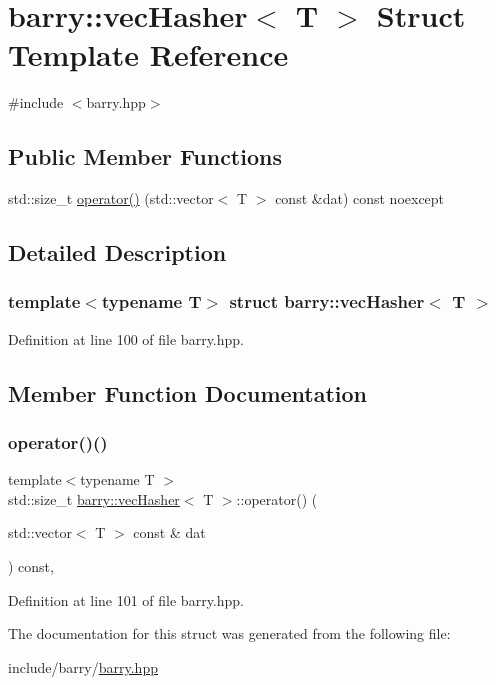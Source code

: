 \hypertarget{structbarry_1_1vec_hasher}{}\section{barry\+:\+:vec\+Hasher$<$ T $>$ Struct Template Reference}
\label{structbarry_1_1vec_hasher}


{\ttfamily \#include $<$barry.\+hpp$>$}

\subsection*{Public Member Functions}
\begin{DoxyCompactItemize}
\item 
std\+::size\+\_\+t \hyperlink{structbarry_1_1vec_hasher_ada8dea483f4fc12f469e161b2fd09225}{operator()} (std\+::vector$<$ T $>$ const \&dat) const noexcept
\end{DoxyCompactItemize}


\subsection{Detailed Description}
\subsubsection*{template$<$typename T$>$\newline
struct barry\+::vec\+Hasher$<$ T $>$}



Definition at line 100 of file barry.\+hpp.



\subsection{Member Function Documentation}
\mbox{\label{structbarry_1_1vec_hasher_ada8dea483f4fc12f469e161b2fd09225}} 
\subsubsection{\texorpdfstring{operator()()}{operator()()}}
{\footnotesize\ttfamily template$<$typename T $>$ \\
std\+::size\+\_\+t \hyperlink{structbarry_1_1vec_hasher}{barry\+::vec\+Hasher}$<$ T $>$\+::operator() (\begin{DoxyParamCaption}\item[{std\+::vector$<$ T $>$ const \&}]{dat }\end{DoxyParamCaption}) const\hspace{0.3cm}{\ttfamily [inline]}, {\ttfamily [noexcept]}}



Definition at line 101 of file barry.\+hpp.



The documentation for this struct was generated from the following file\+:\begin{DoxyCompactItemize}
\item 
include/barry/\hyperlink{barry_8hpp}{barry.\+hpp}\end{DoxyCompactItemize}
